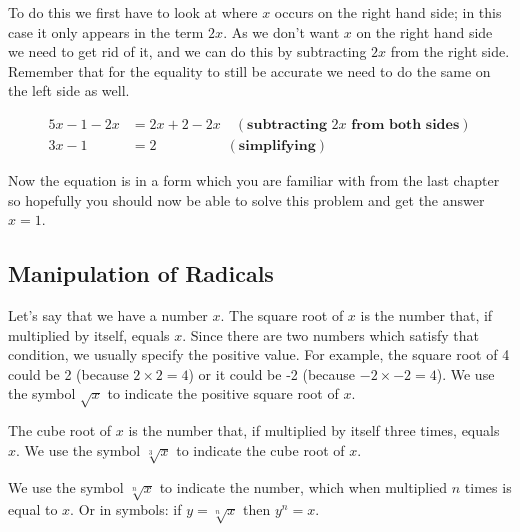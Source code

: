 To do this we first have to look at where $x$ occurs on the right hand side; in this case
it only appears in the term $2x$. As we don't want $x$ on the right hand side we need to
get rid of it, and we can do this by subtracting $2x$ from the right side. Remember that
for the equality to still be accurate we need to do the same on the left side as well.



\begin{align}
5x - 1 - 2x & = 2x + 2 - 2x \quad (\textbf{subtracting } 2x \textbf{ from both sides}) \\ 3x - 1 & = 2 \quad\quad\quad\quad\quad (\textbf{simplifying})
\end{align}





Now the equation is in a form which you are familiar with from the last chapter so
hopefully you should now be able to solve this problem and get the answer $x=1$.




\subsection{Manipulation of Radicals}
\label{sss:mani-fed2}




Let's say that we have a number $x$. The square root of $x$ is the number that, if
multiplied by itself, equals $x$. Since there are two numbers which satisfy that
condition, we usually specify the positive value. For example, the square root of 4 could
be 2 (because $2 \times 2 = 4$) or it could be -2 (because $-2 \times -2 = 4$). We use the
symbol $\sqrt{x}$ to indicate the positive square root of $x$.



The cube root of $x$ is the number that, if multiplied by itself three times, equals $x$.
We use the symbol $\sqrt[3]{x}$ to indicate the cube root of $x$.



We use the symbol $\sqrt[n]{x}$ to indicate the number, which when multiplied $n$ times is
equal to $x$. Or in symbols: if $y = \sqrt[n]{x}$ then $y^n = x$.




